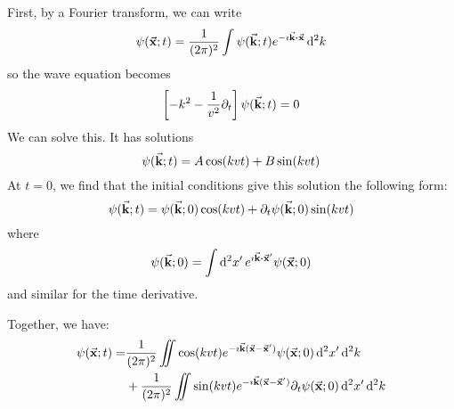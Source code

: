 \documentclass[a4paper,twoside]{article}
\begin{document}
\begin{problem}
    First, by a Fourier transform, we can write
    \begin{equation}
        \psi( \va{x};t) = \frac{1}{(2 \pi)^2} \int \psi( \va{k};t) e^{- \imath \va{k} \vdot \va{x}} \dd[2]{k}
    \end{equation}
    so the wave equation becomes
    \begin{equation}
        \left[ - k^2 - \frac{1}{v^2} \partial_t \right] \psi( \va{k};t) = 0
    \end{equation}
    We can solve this. It has solutions
    \begin{equation}
        \psi( \va{k};t) = A \cos(kvt) + B \sin(kvt)
    \end{equation}
    At $ t = 0 $, we find that the initial conditions give this solution the following form:
    \begin{equation}
        \psi( \va{k};t) = \psi( \va{k};0) \cos(kvt) + \partial_t \psi( \va{k};0) \sin(kvt)
    \end{equation}
    where
    \begin{equation}
        \psi( \va{k};0) = \int \dd[2]{x'} e^{\imath \va{k} \vdot \va{x}'} \psi( \va{x};0)
    \end{equation}
    and similar for the time derivative.

    Together, we have:
    \begin{align}
        \psi( \va{x};t) = &\frac{1}{(2 \pi)^2} \iint \cos(kvt) e^{- \imath \va{k} (\va{x} - \va{x}')} \psi( \va{x};0) \dd[2]{x'} \dd[2]{k} \\ &+ \frac{1}{(2 \pi)^2} \iint \sin(kvt) e^{- \imath \va{k} (\va{x} - \va{x}')} \partial_t \psi( \va{x};0) \dd[2]{x'} \dd[2]{k} 
    \end{align}
    

\end{problem}
\end{document}
